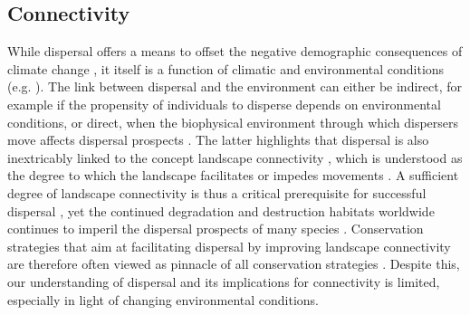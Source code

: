 \documentclass[abstract=on,10pt,a4paper,bibliography=totocnumbered]{article}
\begin{document}
\subsection{Connectivity}
While dispersal offers a means to offset the negative demographic consequences
of climate change \citep{Kokko.2006, Hodgson.2009, Travis.2013}, it itself is a
function of climatic and environmental conditions (e.g. \citealp{Elliot.2014,
Behr.2020}). The link between dispersal and the environment can either be
indirect, for example if the propensity of individuals to disperse depends on
environmental conditions, or direct, when the biophysical environment through
which dispersers move affects dispersal prospects \citep{Travis.2013}. The
latter highlights that dispersal is also inextricably linked to the concept
landscape connectivity \citep{Baguette.2013}, which is understood as the degree
to which the landscape facilitates or impedes movements \citep{Taylor.1993}. A
sufficient degree of landscape connectivity is thus a critical prerequisite for
successful dispersal \citep{Fahrig.2003}, yet the continued degradation and
destruction habitats worldwide continues to imperil the dispersal prospects of
many species \citep{Melbourne.2008, Sawyer.2011}. Conservation strategies that
aim at facilitating dispersal by improving landscape connectivity are therefore
often viewed as pinnacle of all conservation strategies \citep{Heller.2009}.
Despite this, our understanding of dispersal and its implications for
connectivity is limited, especially in light of changing environmental
conditions.
\end{document}
